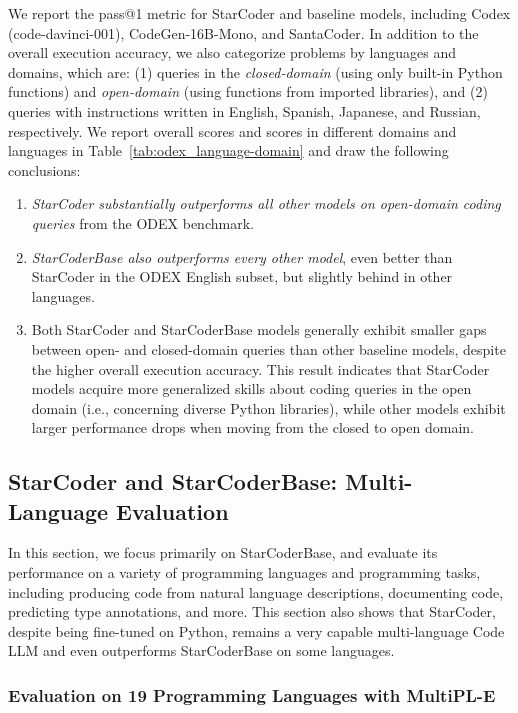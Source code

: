 We report the pass@1 metric for StarCoder and baseline models, including Codex (code-davinci-001), CodeGen-16B-Mono, and SantaCoder. In addition to the overall execution accuracy, we also categorize problems by languages and domains, which are: (1) queries in the \emph{closed-domain} (using only built-in Python functions) and \emph{open-domain} (using functions from imported libraries), and (2) queries with instructions written in English, Spanish, Japanese, and Russian, respectively. We report overall scores and scores in different domains and languages in Table~\ref{tab:odex_language-domain} and draw the following conclusions:

\begin{enumerate}

  \item \emph{StarCoder substantially outperforms all other models on open-domain coding queries} from the ODEX benchmark. 

  \item \emph{StarCoderBase also outperforms every other model}, even better than StarCoder in the ODEX English subset, but slightly behind in other languages.

  \item Both StarCoder and StarCoderBase models generally exhibit smaller gaps between open- and closed-domain queries than other baseline models, despite the higher overall execution accuracy. This result indicates that StarCoder models acquire more generalized skills about coding queries in the open domain (i.e., concerning diverse Python libraries), while other models exhibit larger performance drops when moving from the closed to open domain.
\end{enumerate}

\subsection{StarCoder and StarCoderBase: Multi-Language Evaluation}

In this section, we focus primarily on StarCoderBase, and evaluate its performance on a variety of programming languages and programming tasks, including producing code from natural language descriptions, documenting code, predicting type annotations, and more. This section also shows that StarCoder, despite being fine-tuned on Python, remains a very capable multi-language Code LLM and even outperforms StarCoderBase on some languages.

\subsubsection{Evaluation on 19 Programming Languages with MultiPL-E}\label{sec:text-to-code}

